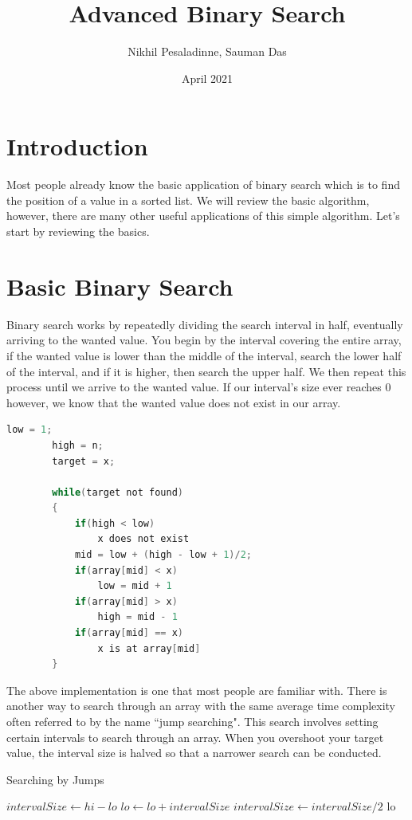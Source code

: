 \documentclass{article}
\title{Advanced Binary Search}
\author{Nikhil Pesaladinne, Sauman Das }
\date{April 2021}
\begin{document}
\maketitle

\section{Introduction}
Most people already know the basic application of binary search which is to find the position of a value in a sorted list. We will review the basic algorithm, however, there are many other useful applications of this simple algorithm. Let's start by reviewing the basics. 

\section{Basic Binary Search}\label{intro}
Binary search works by repeatedly dividing the search interval in half, eventually arriving to the wanted value. You begin by the interval covering the entire array, if the wanted value is lower than the middle of the interval, search the lower half of the interval, and if it is higher, then search the upper half. We then repeat this process until we arrive to the wanted value. If our interval's size ever reaches $0$ however, we know that the wanted value does not exist in our array.

\begin{lstlisting}[language=Java, title=Binary Search Psuedocode]
    low = 1;
		high = n;
		target = x;
		
		while(target not found)
		{
			if(high < low)
				x does not exist
			mid = low + (high - low + 1)/2;
			if(array[mid] < x)
				low = mid + 1
			if(array[mid] > x)
				high = mid - 1
			if(array[mid] == x)
				x is at array[mid]
		}
\end{lstlisting}

The above implementation is one that most people are familiar with. There is another way to search through an array with the same average time complexity often referred to by the name ``jump searching". This search involves setting certain intervals to search through an array. When you overshoot your target value, the interval size is halved so that a narrower search can be conducted. 

\begin{algorithm}
\label{alg:jump}
\caption{Searching by Jumps}
\begin{algorithmic}[1]  
\STATE $intervalSize \leftarrow hi-lo$
\STATE $lo \leftarrow lo+intervalSize$
\ENDWHILE
\STATE $intervalSize \leftarrow intervalSize/2$
\ENDWHILE
\RETURN lo
\end{algorithmic}
\end{algorithm}
\end{document}
